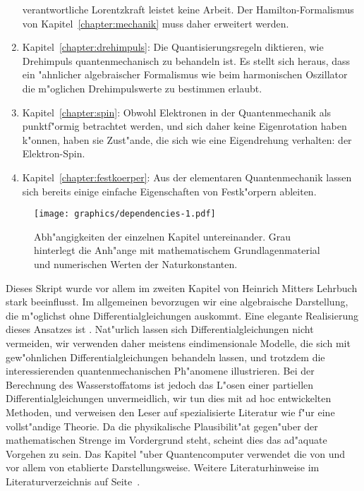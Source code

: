 \begin{enumerate}
verantwortliche Lorentzkraft leistet keine Arbeit.
Der Hamilton-Formalismus von Kapitel~\ref{chapter:mechanik} muss
daher erweitert werden.
\item Kapitel~\ref{chapter:drehimpuls}:
Die Quantisierungsregeln diktieren, wie Drehimpuls quantenmechanisch
zu behandeln ist.
Es stellt sich heraus, dass ein "ahnlicher algebraischer Formalismus 
wie beim harmonischen Oszillator die m"oglichen Drehimpulswerte
zu bestimmen erlaubt.
\item Kapitel~\ref{chapter:spin}:
Obwohl Elektronen in der Quantenmechanik als punktf"ormig betrachtet
werden, und sich daher keine Eigenrotation haben k"onnen,
haben sie Zust"ande, die sich wie eine Eigendrehung verhalten:
der Elektron-Spin.
\item Kapitel~\ref{chapter:festkoerper}:
Aus der elementaren Quantenmechanik lassen sich bereits einige
einfache Eigenschaften von Festk"orpern ableiten.
\end{enumerate}

\begin{figure}
\centering
\texttt{[image: graphics/dependencies-1.pdf]}
\caption{Abh"angigkeiten der einzelnen Kapitel untereinander.
Grau hinterlegt die Anh"ange mit mathematischem Grundlagenmaterial
und numerischen Werten der Naturkonstanten.
\label{skript:dependencies}}
\end{figure}

Dieses Skript wurde vor allem im zweiten Kapitel von Heinrich Mitters
Lehrbuch \cite{skript:mitter} stark beeinflusst. 
Im allgemeinen bevorzugen wir eine algebraische Darstellung, die
m"oglichst ohne Differentialgleichungen auskommt.
Eine elegante Realisierung dieses Ansatzes ist \cite{skript:green}.
Nat"urlich lassen sich Differentialgleichungen nicht vermeiden,
wir verwenden daher meistens eindimensionale Modelle, die sich mit
gew"ohnlichen Differentialgleichungen behandeln lassen, und trotzdem
die interessierenden quantenmechanischen Ph"anomene illustrieren.
Bei der Berechnung des Wasserstoffatoms ist jedoch das L"osen einer partiellen
Differentialgleichungen unvermeidlich, wir tun dies mit ad hoc entwickelten
Methoden, und verweisen den Leser auf spezialisierte Literatur wie 
\cite{skript:evans} f"ur eine vollst"andige Theorie.
Da die physikalische Plausibilit"at gegen"uber der mathematischen Strenge
im Vordergrund steht, scheint dies das ad"aquate Vorgehen zu sein.
Das Kapitel "uber Quantencomputer verwendet die von
\cite{skript:kaye-et-al} und vor allem von
\cite{skript:arorabarak} etablierte Darstellungsweise.
Weitere Literaturhinweise im Literaturverzeichnis auf
Seite~\pageref{skript:literatur}.

